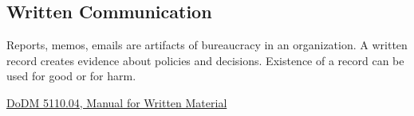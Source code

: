 \subsection{Written Communication}



Reports, memos, emails are artifacts of bureaucracy in an organization. A written record creates evidence about policies and decisions. Existence of a record can be used for good or for harm.



\href{https://www.google.com/search?q=dodm+5110.04}{DoDM 5110.04, Manual for Written Material}